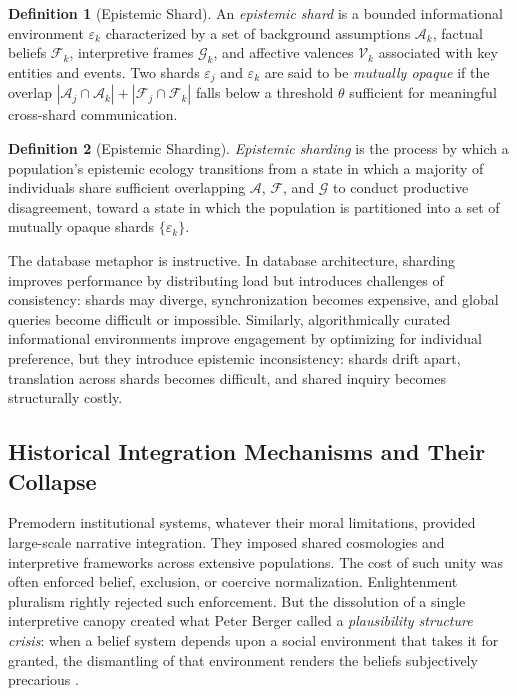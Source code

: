 \documentclass[12pt]{article}
\theoremstyle{definition}
\newtheorem{definition}{Definition}[section]
\theoremstyle{plain}
\begin{document}
\begin{definition}[Epistemic Shard]
An \emph{epistemic shard} is a bounded informational environment $\varepsilon_k$ characterized by a set of background assumptions $\mathcal{A}_k$, factual beliefs $\mathcal{F}_k$, interpretive frames $\mathcal{G}_k$, and affective valences $\mathcal{V}_k$ associated with key entities and events. Two shards $\varepsilon_j$ and $\varepsilon_k$ are said to be \emph{mutually opaque} if the overlap $|\mathcal{A}_j \cap \mathcal{A}_k| + |\mathcal{F}_j \cap \mathcal{F}_k|$ falls below a threshold $\theta$ sufficient for meaningful cross-shard communication.
\end{definition}

\begin{definition}[Epistemic Sharding]
\emph{Epistemic sharding} is the process by which a population's epistemic ecology transitions from a state in which a majority of individuals share sufficient overlapping $\mathcal{A}$, $\mathcal{F}$, and $\mathcal{G}$ to conduct productive disagreement, toward a state in which the population is partitioned into a set of mutually opaque shards $\{\varepsilon_k\}$.
\end{definition}

The database metaphor is instructive. In database architecture, sharding improves performance by distributing load but introduces challenges of consistency: shards may diverge, synchronization becomes expensive, and global queries become difficult or impossible. Similarly, algorithmically curated informational environments improve engagement by optimizing for individual preference, but they introduce epistemic inconsistency: shards drift apart, translation across shards becomes difficult, and shared inquiry becomes structurally costly.

\subsection{Historical Integration Mechanisms and Their Collapse}

Premodern institutional systems, whatever their moral limitations, provided large-scale narrative integration. They imposed shared cosmologies and interpretive frameworks across extensive populations. The cost of such unity was often enforced belief, exclusion, or coercive normalization. Enlightenment pluralism rightly rejected such enforcement. But the dissolution of a single interpretive canopy created what Peter Berger called a \emph{plausibility structure crisis}: when a belief system depends upon a social environment that takes it for granted, the dismantling of that environment renders the beliefs subjectively precarious \citep{Berger1967}.
\end{document}
